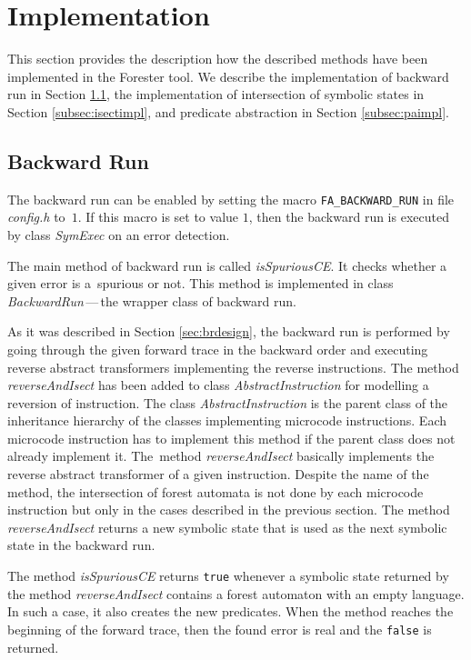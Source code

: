 \section{Implementation}
\label{sec:impl}

This section provides the description how the described methods have been implemented
in the Forester tool.
We describe the implementation of backward run in Section \ref{subsec:bwimpl},
the implementation of intersection of symbolic states in Section \ref{subsec:isectimpl}, and
predicate abstraction in Section \ref{subsec:paimpl}.

\subsection{Backward Run}
\label{subsec:bwimpl}

The backward run can be enabled by setting the macro {\tt FA\_BACKWARD\_RUN}
in file \emph{config.h} to~$1$.
If this macro is set to value $1$, then the backward run is executed
by class \emph{SymExec} on an error detection.

The main method of backward run is called \emph{isSpuriousCE}.
It checks whether a given error is a~spurious or not.
This method is implemented in class \emph{BackwardRun}\,---\,the wrapper
class of backward run.

As it was described in Section \ref{sec:brdesign},
the backward run is performed by going through the given
forward trace in the backward order and executing reverse abstract transformers implementing
the reverse instructions.
The method \emph{reverseAndIsect} has been added to class \emph{AbstractInstruction}
for modelling a reversion of instruction.
The class \emph{AbstractInstruction} is the parent class of the inheritance hierarchy of
the classes implementing microcode instructions.
Each microcode instruction has to implement this method if the parent class does not
already implement it.
The~method \emph{reverseAndIsect} basically implements
the reverse abstract transformer of a given instruction.
Despite the name of the method, the intersection of forest automata
is not done by each microcode instruction but only in the cases described in
the previous section.
The method \emph{reverseAndIsect} returns a new symbolic state that
is used as the next symbolic state in the backward run.

The method \emph{isSpuriousCE} returns {\tt true} whenever
a symbolic state returned by the method \emph{reverseAndIsect}
contains a forest automaton with an empty language.
In such a case, it also creates the new predicates.
When the method reaches the beginning of the forward
trace, then the found error is real and the {\tt false}
is returned.

